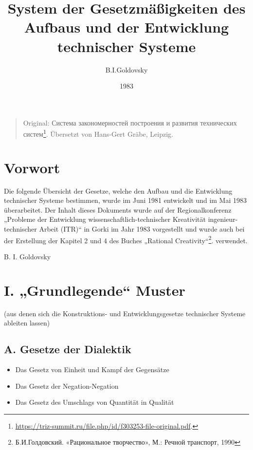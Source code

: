 \documentclass[11pt,a4paper]{article}
\title{System der Gesetzmäßigkeiten des Aufbaus und der Entwicklung
  technischer Systeme }
\author{B.I.Goldovsky}
\date{1983}
\begin{document}
\maketitle
\begin{quote}
  Original: \foreignlanguage{russian}{Система закономерностей построения и
    развития технических
    систем}\footnote{\url{https://triz-summit.ru/file.php/id/f303253-file-original.pdf}.}.
  Übersetzt von Hans-Gert Gräbe, Leipzig.
\end{quote}

\section*{Vorwort}

Die folgende Übersicht der Gesetze, welche den Aufbau und die Entwicklung
technischer Systeme bestimmen, wurde im Juni 1981 entwickelt und im Mai 1983
überarbeitet. Der Inhalt dieses Dokuments wurde auf der Regionalkonferenz
„Probleme der Entwicklung wissenschaftlich-technischer Kreativität
ingenieur-technischer Arbeit (ITR)“ in Gorki im Jahr 1983 vorgestellt und
wurde auch bei der Erstellung der Kapitel 2 und 4 des Buches „Rational
Creativity“\footnote{\foreignlanguage{russian}{Б.И.Голдовский. «Рациональное
    творчество», М.: Речной транспорт, 1990}}. verwendet.

\begin{flushright}
  B. I. Goldovsky
\end{flushright}

\section*{I. „Grundlegende“ Muster}
(aus denen sich die Konstruktions- und Entwicklungsgesetze technischer Systeme
ableiten lassen) 
\subsection*{A. Gesetze der Dialektik}
\begin{itemize}\itemsep0pt
\item[1.1.] Das Gesetz von Einheit und Kampf der Gegensätze
\item[1.2.] Das Gesetz der Negation-Negation
\item[1.3.] Das Gesetz des Umschlags von Quantität in Qualität
\end{itemize}
\end{document}
